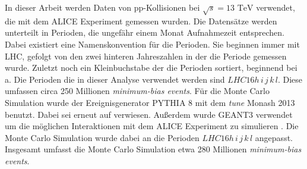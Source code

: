 In dieser Arbeit werden Daten von pp-Kollisionen bei $\sqrt{s}=13\text{ TeV}$ verwendet, die mit dem ALICE Experiment gemessen wurden.
Die Datensätze werden unterteilt in Perioden, die ungefähr einem Monat Aufnahmezeit entsprechen.
Dabei existiert eine Namenskonvention für die Perioden.
Sie beginnen immer mit LHC, gefolgt von den zwei hinteren Jahreszahlen in der die Periode gemessen wurde.
Zuletzt noch ein Kleinbuchstabe der die Perioden sortiert, beginnend bei a.
Die Perioden die in dieser Analyse verwendet werden sind $LHC16h\,i\,j\,k\,l$.
Diese umfassen circa 250 Millionen \textit{minimum-bias events}.
\newline
Für die Monte Carlo Simulation wurde der Ereignisgenerator PYTHIA 8 mit dem \textit{tune} Monash 2013 benutzt.
Dabei sei erneut auf \cite{thesis:Krissy} verwiesen.
Außerdem wurde GEANT3 verwendet um die möglichen Interaktionen mit dem ALICE Experiment zu simulieren \cite{Brun:118715}.
Die Monte Carlo Simulation wurde dabei an die  Perioden $LHC16h\,i\,j\,k\,l$ angepasst.
Insgesamt umfasst die Monte Carlo Simulation etwa 280 Millionen \textit{minimum-bias events}.